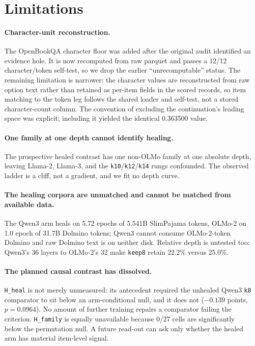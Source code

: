 \section{Limitations}

\paragraph{Character-unit reconstruction.}
The OpenBookQA character floor was added after the original audit identified an evidence hole. It is now recomputed from raw parquet and passes a 12/12 character/token self-test, so we drop the earlier ``unrecomputable'' status. The remaining limitation is narrower: the character values are reconstructed from raw option text rather than retained as per-item fields in the scored records, so item matching to the token leg follows the shared loader and self-test, not a stored character-count column. The convention of excluding the continuation's leading space was explicit; including it yielded the identical 0.363500 value.

\paragraph{One family at one depth cannot identify healing.}
The prospective healed contrast has one non-OLMo family at one absolute depth, leaving Llama-2, Llama-3, and the \texttt{k10}/\texttt{k12}/\texttt{k14} rungs confounded. The observed ladder is a cliff, not a gradient, and we fit no depth curve.

\paragraph{The healing corpora are unmatched and cannot be matched from available data.}
The Qwen3 arm heals on 5.72 epochs of 5.541B SlimPajama tokens, OLMo-2 on 1.0 epoch of 31.7B Dolmino tokens; Qwen3 cannot consume OLMo-2-token Dolmino and raw Dolmino text is on neither disk. Relative depth is untested too: Qwen3's 36 layers to OLMo-2's 32 make \texttt{keep8} retain 22.2\% versus 25.0\%.

\paragraph{The planned causal contrast has dissolved.}
\texttt{H\_heal} is not merely unmeasured: its antecedent required the unhealed Qwen3 \texttt{k8} comparator to sit below an arm-conditional null, and it does not ($-0.139$ points, $p=0.0964$). No amount of further training repairs a comparator failing the criterion. \texttt{H\_family} is equally unavailable because 0/27 cells are significantly below the permutation null. A future read-out can ask only whether the healed arm has material item-level signal.

